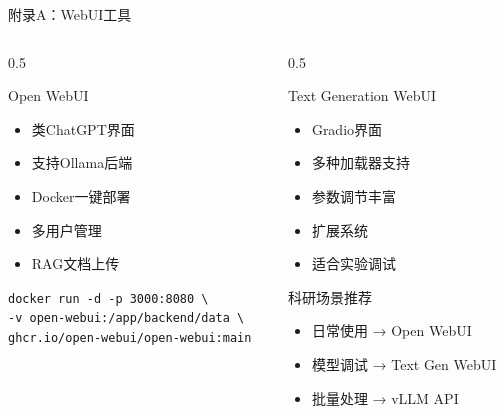 \documentclass[aspectratio=169,11pt]{beamer}
\begin{document}
\begin{frame}{附录A：WebUI工具}
    \begin{columns}
        \begin{column}{0.5\textwidth}
            \begin{block}{Open WebUI}
                \begin{itemize}
                    \item 类ChatGPT界面
                    \item 支持Ollama后端
                    \item Docker一键部署
                    \item 多用户管理
                    \item RAG文档上传
                \end{itemize}
                
                \vspace{0.2cm}
                \texttt{\tiny docker run -d -p 3000:8080 \textbackslash\\
                -v open-webui:/app/backend/data \textbackslash\\
                ghcr.io/open-webui/open-webui:main}
            \end{block}
        \end{column}
        \begin{column}{0.5\textwidth}
            \begin{block}{Text Generation WebUI}
                \begin{itemize}
                    \item Gradio界面
                    \item 多种加载器支持
                    \item 参数调节丰富
                    \item 扩展系统
                    \item 适合实验调试
                \end{itemize}
            \end{block}
            
            \vspace{0.3cm}
            \begin{exampleblock}{科研场景推荐}
                \small
                \begin{itemize}
                    \item 日常使用 → Open WebUI
                    \item 模型调试 → Text Gen WebUI
                    \item 批量处理 → vLLM API
                \end{itemize}
            \end{exampleblock}
        \end{column}
    \end{columns}
\end{frame}
\end{document}
